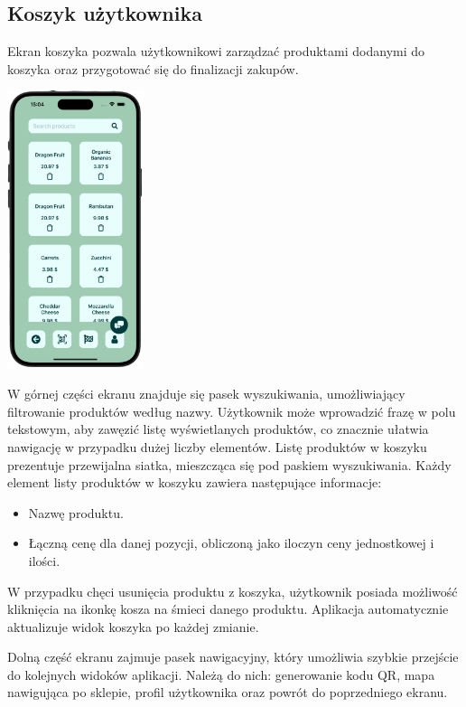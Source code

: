 \subsection{Koszyk użytkownika}

Ekran koszyka pozwala użytkownikowi zarządzać produktami dodanymi do koszyka oraz przygotować się do finalizacji zakupów. 

\begin{center}
    \includegraphics[width=0.3\textwidth]{images/front/cart_page.png}
\end{center}

W górnej części ekranu znajduje się pasek wyszukiwania, umożliwiający filtrowanie produktów według nazwy. Użytkownik może wprowadzić frazę w polu tekstowym, aby zawęzić listę wyświetlanych produktów, co znacznie ułatwia nawigację w przypadku dużej liczby elementów. Listę produktów w koszyku prezentuje przewijalna siatka, mieszcząca się pod paskiem wyszukiwania. Każdy element listy produktów w koszyku zawiera następujące informacje:
\begin{itemize}
    \item Nazwę produktu.
    \item Łączną cenę dla danej pozycji, obliczoną jako iloczyn ceny jednostkowej i ilości.
\end{itemize}

W przypadku chęci usunięcia produktu z koszyka, użytkownik posiada możliwość kliknięcia na ikonkę kosza na śmieci danego produktu. Aplikacja automatycznie aktualizuje widok koszyka po każdej zmianie.

Dolną część ekranu zajmuje pasek nawigacyjny, który umożliwia szybkie przejście do kolejnych widoków aplikacji. Należą do nich: generowanie kodu QR, mapa nawigująca po sklepie, profil użytkownika oraz powrót do poprzedniego ekranu.

